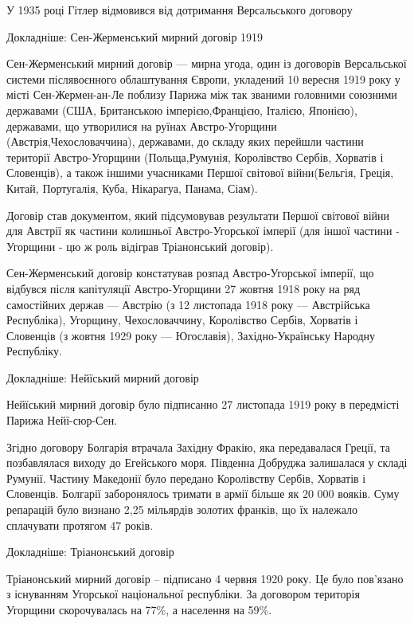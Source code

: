 \begin{itemize}
\begin{itemize}
\begin{multicols}{2}
У 1935 році Гітлер відмовився від дотримання Версальського договору


Докладніше: Сен-Жерменський мирний договір 1919

Сен-Жерменський мирний договір — мирна угода, один із договорів Версальської
системи післявоєнного облаштування Європи, укладений 10 вересня 1919 року у
місті Сен-Жермен-ан-Ле поблизу Парижа між так званими головними союзними
державами (США, Британською імперією,Францією, Італією, Японією), державами, що
утворилися на руїнах Австро-Угорщини (Австрія,Чехословаччина), державами, до
складу яких перейшли частини території Австро-Угорщини (Польща,Румунія,
Королівство Сербів, Хорватів і Словенців), а також іншими учасниками Першої
світової війни(Бельгія, Греція, Китай, Португалія, Куба, Нікарагуа, Панама,
Сіам).

Договір став документом, який підсумовував результати Першої світової війни для
Австрії як частини колишньої Австро-Угорської імперії (для іншої частини -
Угорщини - цю ж роль відіграв Тріанонський договір).

Сен-Жерменський договір констатував розпад Австро-Угорської імперії, що
відбувся після капітуляції Австро-Угорщини 27 жовтня 1918 року на ряд
самостійних держав — Австрію (з 12 листопада 1918 року — Австрійська
Республіка), Угорщину, Чехословаччину, Королівство Сербів, Хорватів і Словенців
(з жовтня 1929 року — Югославія), Західно-Українську Народну Республіку.


Докладніше: Нейїський мирний договір

Нейїський мирний договір було підписанно 27 листопада 1919 року в передмісті Парижа Нейї-сюр-Сен.

Згідно договору Болгарія втрачала Західну Фракію, яка передавалася Греції, та
позбавлялася виходу до Егейського моря. Південна Добруджа залишалася у складі
Румунії. Частину Македонії було передано Королівству Сербів, Хорватів і
Словенців. Болгарії заборонялось тримати в армії більше як 20 000 вояків. Суму
репарацій було визнано 2,25 мільярдів золотих франків, що їх належало
сплачувати протягом 47 років.


Докладніше: Тріанонський договір

Тріанонський мирний договір – підписано 4 червня 1920 року. Це було пов’язано з
існуванням Угорської національної республіки. За договором територія Угорщини
скорочувалась на 77\%, а населення на 59\%.


\end{multicols}
\end{itemize}
\end{itemize}

